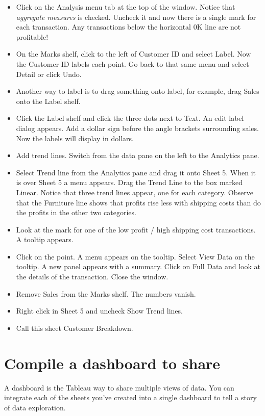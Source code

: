 \begin{itemize}
\tightlist
\item
  Click on the Analysis menu tab at the top of the window. Notice that
  \emph{aggregate measures} is checked. Uncheck it and now there is a
  single mark for each transaction. Any transactions below the
  horizontal 0K line are not profitable!
\item
  On the Marks shelf, click to the left of Customer ID and select Label.
  Now the Customer ID labels each point. Go back to that same menu and
  select Detail or click Undo.
\item
  Another way to label is to drag something onto label, for example,
  drag Sales onto the Label shelf.
\item
  Click the Label shelf and click the three dots next to Text. An edit
  label dialog appears. Add a dollar sign before the angle brackets
  surrounding sales. Now the labels will display in dollars.
\item
  Add trend lines. Switch from the data pane on the left to the
  Analytics pane.
\item
  Select Trend line from the Analytics pane and drag it onto Sheet 5.
  When it is over Sheet 5 a menu appears. Drag the Trend Line to the box
  marked Linear. Notice that three trend lines appear, one for each
  category. Observe that the Furniture line shows that profits rise less
  with shipping costs than do the profits in the other two categories.
\item
  Look at the mark for one of the low profit / high shipping cost
  transactions. A tooltip appears.
\item
  Click on the point. A menu appears on the tooltip. Select View Data on
  the tooltip. A new panel appears with a summary. Click on Full Data
  and look at the details of the transaction. Close the window.
\item
  Remove Sales from the Marks shelf. The numbers vanish.
\item
  Right click in Sheet 5 and uncheck Show Trend lines.
\item
  Call this sheet Customer Breakdown.
\end{itemize}

\section{Compile a dashboard to
share}\label{compile-a-dashboard-to-share}

A dashboard is the Tableau way to share multiple views of data. You can
integrate each of the sheets you've created into a single dashboard to
tell a story of data exploration.

